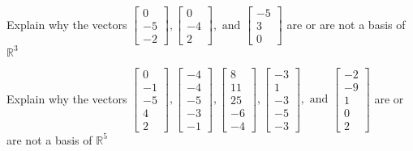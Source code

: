 \documentclass{article}
\begin{document}

\begin{exerciseStatement}
    Explain why the vectors \(\left[\begin{array}{r}
0 \\
-5 \\
-2
\end{array}\right] , \left[\begin{array}{r}
0 \\
-4 \\
2
\end{array}\right] , \text{ and } \left[\begin{array}{r}
-5 \\
3 \\
0
\end{array}\right]\) are or are not a basis of \(\mathbb{R}^3\)


  
\end{exerciseStatement}

\begin{exerciseStatement}
    Explain why the vectors \(\left[\begin{array}{r}
0 \\
-1 \\
-5 \\
4 \\
2
\end{array}\right] , \left[\begin{array}{r}
-4 \\
-4 \\
-5 \\
-3 \\
-1
\end{array}\right] , \left[\begin{array}{r}
8 \\
11 \\
25 \\
-6 \\
-4
\end{array}\right] , \left[\begin{array}{r}
-3 \\
1 \\
-3 \\
-5 \\
-3
\end{array}\right] , \text{ and } \left[\begin{array}{r}
-2 \\
-9 \\
1 \\
0 \\
2
\end{array}\right]\) are or are not a basis of \(\mathbb{R}^5\)


  
\end{exerciseStatement}
\end{document}
